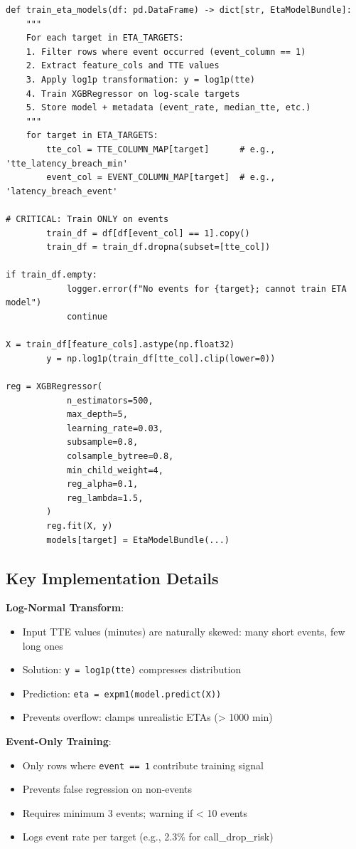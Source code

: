 \documentclass[11pt,a4paper,oneside]{report}
\begin{document}
\begin{lstlisting}
def train_eta_models(df: pd.DataFrame) -> dict[str, EtaModelBundle]:
    """
    For each target in ETA_TARGETS:
    1. Filter rows where event occurred (event_column == 1)
    2. Extract feature_cols and TTE values
    3. Apply log1p transformation: y = log1p(tte)
    4. Train XGBRegressor on log-scale targets
    5. Store model + metadata (event_rate, median_tte, etc.)
    """
    for target in ETA_TARGETS:
        tte_col = TTE_COLUMN_MAP[target]      # e.g., 'tte_latency_breach_min'
        event_col = EVENT_COLUMN_MAP[target]  # e.g., 'latency_breach_event'

# CRITICAL: Train ONLY on events
        train_df = df[df[event_col] == 1].copy()
        train_df = train_df.dropna(subset=[tte_col])

if train_df.empty:
            logger.error(f"No events for {target}; cannot train ETA model")
            continue

X = train_df[feature_cols].astype(np.float32)
        y = np.log1p(train_df[tte_col].clip(lower=0))

reg = XGBRegressor(
            n_estimators=500,
            max_depth=5,
            learning_rate=0.03,
            subsample=0.8,
            colsample_bytree=0.8,
            min_child_weight=4,
            reg_alpha=0.1,
            reg_lambda=1.5,
        )
        reg.fit(X, y)
        models[target] = EtaModelBundle(...)
\end{lstlisting}

\subsection{Key Implementation Details}

\textbf{Log-Normal Transform}:
\begin{itemize}
    \item Input TTE values (minutes) are naturally skewed: many short events, few long ones
    \item Solution: \texttt{y = log1p(tte)} compresses distribution
    \item Prediction: \texttt{eta = expm1(model.predict(X))}
    \item Prevents overflow: clamps unrealistic ETAs (> 1000 min)
\end{itemize}

\textbf{Event-Only Training}:
\begin{itemize}
    \item Only rows where \texttt{event == 1} contribute training signal
    \item Prevents false regression on non-events
    \item Requires minimum 3 events; warning if < 10 events
    \item Logs event rate per target (e.g., 2.3\% for call\_drop\_risk)
\end{itemize}
\end{document}

